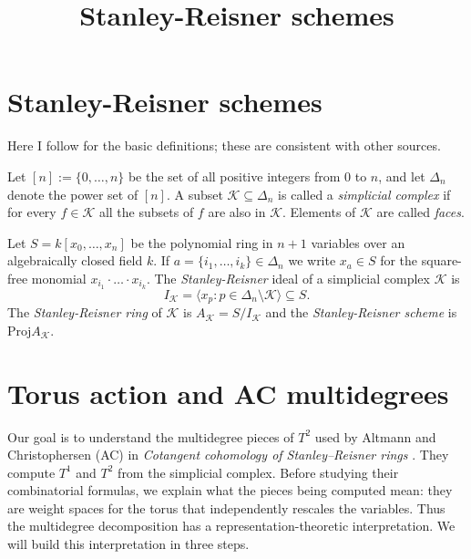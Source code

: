 



\title{Stanley-Reisner schemes}
\maketitle

\label{section-phantom}

\tableofcontents

\section{Stanley-Reisner schemes}
\label{section-sr}

\noindent
Here I follow \cite{luk1} for the basic definitions; these
are consistent with other sources.

Let $[n]:=\{0,\ldots,n\}$ be the set of all
positive integers from 0 to $n$, and let
$\Delta_n$ denote the power set of $[n]$. A
subset $\mathcal{K} \subseteq \Delta_n$ is
called a {\it simplicial complex} if for
every $f \in \mathcal{K}$ all the subsets of
$f$ are also in $\mathcal{K}$. Elements of
$\mathcal{K}$ are called {\it faces}.

Let $S=k[x_0,\ldots,x_n]$ be the polynomial ring in $n+1$ variables
over an algebraically closed field $k$.
If $a=\{i_1,\ldots,i_k\}\in \Delta_n$ we write $x_a \in S$ 
for the square-free monomial $x_{i_1}\cdot\ldots\cdot x_{i_k}$.
The {\it Stanley-Reisner} ideal
of a simplicial complex $\mathcal{K}$ is
$$
I_{\mathcal{K}}=\langle x_p : p \in \Delta_n\setminus \mathcal{K} \rangle
\subseteq S.
$$
The {\it Stanley-Reisner ring} of $\mathcal{K}$ is
$A_{\mathcal{K}}=S/I_{\mathcal{K}}$
and the {\it Stanley-Reisner scheme} is $\text{Proj} A_{\mathcal{K}}$.

\section{Torus action and AC multidegrees}
\label{section-torus-action-ac-multidegrees}

\noindent
Our goal is to understand the multidegree
pieces of $T^2$ used by
Altmann and Christophersen (AC) in
\emph{Cotangent cohomology of
Stanley--Reisner rings} \cite{jan3}.
They compute $T^1$ and $T^2$ from the
simplicial complex. Before studying their
combinatorial formulas, we explain what
the pieces being computed mean:
they are weight spaces for the torus
that independently rescales the variables.
Thus the multidegree decomposition has a
representation-theoretic interpretation.
We will build this interpretation in
three steps.

